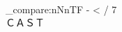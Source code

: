 \documentclass{article}
\newcommand{\oneline}[1]{%
	\newdimen{\namewidth}%
	\setlength{\namewidth}{\widthof{#1}}%
	\ifthenelse{\lengthtest{\namewidth < \textwidth}}%
	{#1}%
	{\resizebox{\textwidth}{!}{#1}}%
}
\newenvironment{sentence}[1]
{
	\str_set:Nn \l_param_str {#1}
	\str_if_empty:NTF \l_param_str
		{\begin{description}[style = unboxed, labelsep = 0pt, nosep, leftmargin = 0pt] \item[]}
		{\begin{description}[style = unboxed, labelsep = 0pt, nosep, leftmargin = \widthof{#1：}] \item[#1：]}
}
{
	\end{description}
}
\newlength\wordheight
\begin{document}
\setlength{\parindent}{0pt}

\vspace*{0mm}%
\vspace{-\parskip}
\vspace{-2\baselineskip} %

\begin{center}
{\fontsize{16pt}{24pt}\selectfont
	\textbf{
	} \\
	\oneline{
	}
\par}
\end{center}

\begin{myfigure}[blanker]
\end{myfigure}



\ExplSyntaxOn
\dim_compare:nNnTF {\textheight - \pagetotal} < {\textheight / 7} {\newpage} {\mbox{}\\}
\ExplSyntaxOff
ＣＡＳＴ
{
\fontsize{11}{11}\selectfont
\setcellgapes{1pt} \makegapedcells
\begin{tabularx}{\textwidth}{|Y|Y|Y|}
\hline
\end{tabularx}
}
\picturepadding{
}
\end{document}
